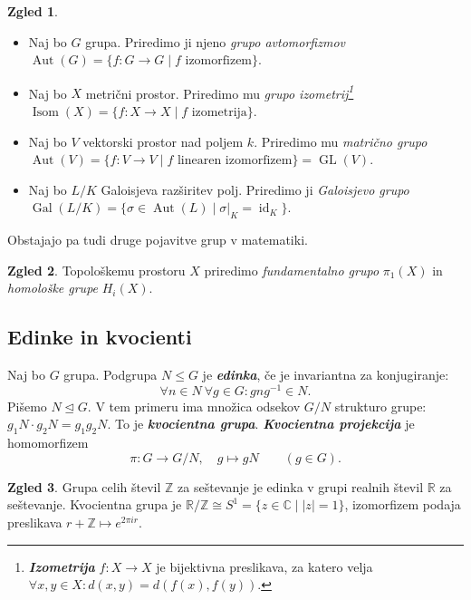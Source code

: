 \documentclass[11pt]{book}
\def\ZZ{\mathbb{Z}}
\def\RR{\mathbb{R}}
\def\CC{\mathbb{C}}
\DeclareMathOperator\Aut{Aut}
\DeclareMathOperator\GL{GL}
\DeclareMathOperator\Gal{Gal}
\DeclareMathOperator\Isom{Isom}
\DeclareMathOperator\id{id}
\def\definicija{\color{rdeca}\bf\em}
\theoremstyle{definition}
\theoremstyle{zgled}
\newtheorem*{zgled}{Zgled}
\theoremstyle{odprtproblem}
\theoremstyle{domacanaloga}
\theoremstyle{izrek}
\begin{document}
\begin{zgled}
\begin{itemize}
	\item Naj bo $G$ grupa. Priredimo ji njeno {\em grupo avtomorfizmov} $\Aut(G) = \{ f \colon G \to G \mid f \text{ izomorfizem} \}$.

    \item Naj bo $X$ metrični prostor. Priredimo mu {\em grupo izometrij\footnote{{\definicija Izometrija} $f \colon X \to X$ je bijektivna preslikava, za katero velja $\forall x,y \in X \colon d(x,y) = d(f(x), f(y))$.}} $\Isom(X) = \{ f \colon X \to X \mid f \text{ izometrija}\}$.

    \item Naj bo $V$ vektorski prostor nad poljem $k$. Priredimo mu {\em matrično grupo} $\Aut(V) = \{ f \colon V \to V \mid f \text{ linearen izomorfizem} \} = \GL(V)$.

    \item Naj bo $L/K$ Galoisjeva razširitev polj. Priredimo ji {\em Galoisjevo grupo} $\Gal(L/K) = \{ \sigma \in \Aut(L) \mid \sigma |_K = \id_K \}$.
\end{itemize}
\end{zgled}

Obstajajo pa tudi druge pojavitve grup v matematiki.

\begin{zgled}
Topološkemu prostoru $X$ priredimo {\em fundamentalno grupo} $\pi_1(X)$ in {\em homološke grupe} $H_i(X)$.
\end{zgled}

\subsection{Edinke in kvocienti}

Naj bo $G$ grupa. Podgrupa $N \leq G$ je {\definicija edinka}, če je invariantna za konjugiranje:
\[
\forall n \in N \ \forall g \in G \colon g n g^{-1} \in N.
\]
Pišemo $N \unlhd G$. V tem primeru ima množica odsekov $G/N$ strukturo grupe: $g_1 N \cdot g_2 N = g_1g_2 N$. To je {\definicija kvocientna grupa}. {\definicija Kvocientna projekcija} je homomorfizem
\[
\pi \colon G \to G/N, \quad g \mapsto gN \qquad (g \in G).
\]

\begin{zgled}
Grupa celih števil $\ZZ$ za seštevanje je edinka v grupi realnih števil $\RR$ za seštevanje. Kvocientna grupa je $\RR/\ZZ \cong S^1 = \{ z \in \CC \mid |z| = 1 \}$, izomorfizem podaja preslikava $r + \ZZ \mapsto e^{2 \pi i r}$.
\end{zgled}
\end{document}
